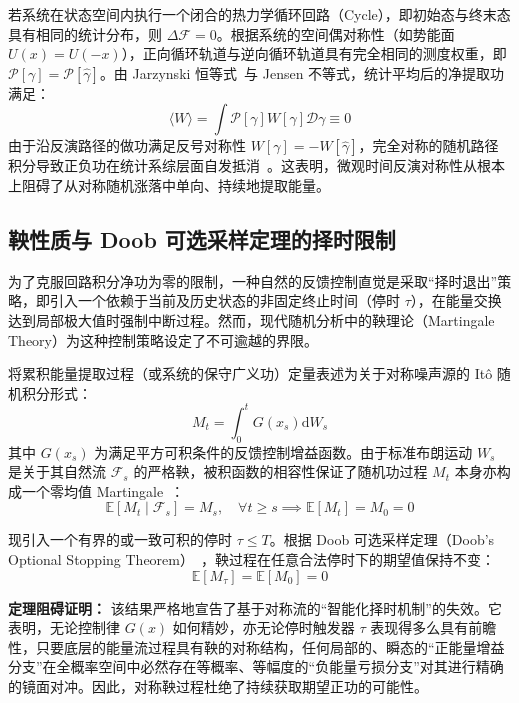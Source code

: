 ﻿\documentclass[10pt,a4paper]{article}
\numberwithin{equation}{section}
\begin{document}
若系统在状态空间内执行一个闭合的热力学循环回路（Cycle），即初始态与终末态具有相同的统计分布，则 $\Delta \mathcal{F} = 0$。根据系统的空间偶对称性（如势能面 $U(x) = U(-x)$），正向循环轨道与逆向循环轨道具有完全相同的测度权重，即 $\mathcal{P}[\gamma] = \mathcal{P}[\hat{\gamma}]$。由 Jarzynski 恒等式~\cite{Jarzynski1997}与 Jensen 不等式，统计平均后的净提取功满足：
\begin{equation}
    \langle W \rangle = \int \mathcal{P}[\gamma] W[\gamma] \mathcal{D}\gamma \equiv 0
\end{equation}
由于沿反演路径的做功满足反号对称性 $W[\gamma] = -W[\hat{\gamma}]$，完全对称的随机路径积分导致正负功在统计系综层面自发抵消~\cite{Seifert2012}。这表明，微观时间反演对称性从根本上阻碍了从对称随机涨落中单向、持续地提取能量。

\subsection{鞅性质与 Doob 可选采样定理的择时限制}
\label{subsec:martingale_obstruction}

为了克服回路积分净功为零的限制，一种自然的反馈控制直觉是采取“择时退出”策略，即引入一个依赖于当前及历史状态的非固定终止时间（停时 $\tau$），在能量交换达到局部极大值时强制中断过程。然而，现代随机分析中的鞅理论（Martingale Theory）为这种控制策略设定了不可逾越的界限。

将累积能量提取过程（或系统的保守广义功）定量表述为关于对称噪声源的 It\^{o} 随机积分形式：
\begin{equation}
    M_t = \int_0^t G(x_s) \mathrm{d}W_s
\end{equation}
其中 $G(x_s)$ 为满足平方可积条件的反馈控制增益函数。由于标准布朗运动 $W_s$ 是关于其自然流 $\mathcal{F}_s$ 的严格鞅，被积函数的相容性保证了随机功过程 $M_t$ 本身亦构成一个零均值 Martingale~\cite{RevuzYor1999}：
\begin{equation}
    \mathbb{E}[M_t \mid \mathcal{F}_s] = M_s, \quad \forall t \ge s \implies \mathbb{E}[M_t] = M_0 = 0
\end{equation}

现引入一个有界的或一致可积的停时 $\tau \le T$。根据 Doob 可选采样定理（Doob's Optional Stopping Theorem）~\cite{RevuzYor1999}，鞅过程在任意合法停时下的期望值保持不变：
\begin{equation}
    \mathbb{E}[M_\tau] = \mathbb{E}[M_0] = 0
\end{equation}

\textbf{定理阻碍证明：} 该结果严格地宣告了基于对称流的“智能化择时机制”的失效。它表明，无论控制律 $G(x)$ 如何精妙，亦无论停时触发器 $\tau$ 表现得多么具有前瞻性，只要底层的能量流过程具有鞅的对称结构，任何局部的、瞬态的“正能量增益分支”在全概率空间中必然存在等概率、等幅度的“负能量亏损分支”对其进行精确的镜面对冲。因此，对称鞅过程杜绝了持续获取期望正功的可能性。
\end{document}
